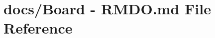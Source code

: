 \hypertarget{Board_01-_01RMDO_8md}{\section{docs/\+Board -\/ R\+M\+D\+O.\+md File Reference}
\label{Board_01-_01RMDO_8md}
}
